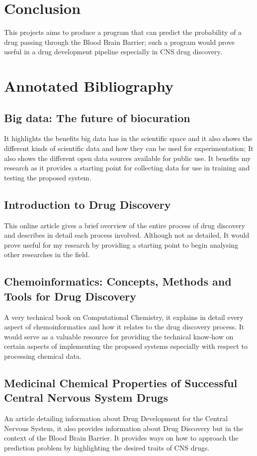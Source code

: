 \documentclass[a4paper,12pt]{article}
\begin{document}
	\section{Conclusion} 
	This projects aims to produce a program that can predict the probability of a drug passing through the Blood Brain Barrier; such a program would prove useful in a drug development pipeline especially in CNS drug discovery.
	
	\newpage
	
	\section{Annotated Bibliography}
		\subsection{Big data: The future of biocuration}
		It highlights the benefits big data has in the scientific space and it also shows the different kinds of scientific data and how they can be used for experimentation; It also shows the different open data sources available for public use. It benefits my research as it provides a starting point for collecting data for use in training and testing the proposed system.
		\subsection{Introduction to Drug Discovery}
		This online article gives a brief overview of the entire process of drug discovery and describes in detail each process involved. Although not as detailed, It would prove useful for my research by providing a starting point to begin analysing other researches in the field.
		\subsection{Chemoinformatics: Concepts, Methods and Tools for Drug Discovery}
		A very technical book on Computational Chemistry, it explains in detail every aspect of chemoinformatics and how it relates to the drug discovery process. It would serve as a valuable resource for providing the technical know-how on certain aspects of implementing the proposed systems especially with respect to processing chemical data.
		\subsection{Medicinal Chemical Properties of Successful Central Nervous System Drugs}
		An article detailing information about Drug Development for the Central Nervous System, it also provides information about Drug Discovery but in the context of the Blood Brain Barrier. It provides ways on how to approach the prediction problem by highlighting the desired traits of CNS drugs.
\end{document}
